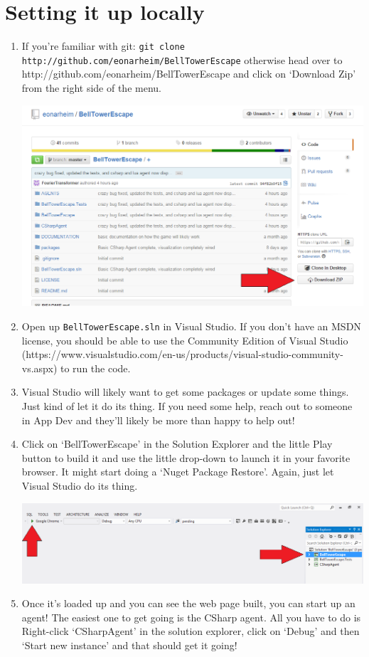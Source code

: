 \documentclass{article}
\begin{document}
\section*{Setting it up locally}
\begin{enumerate}
\item If you're familiar with git: \verb|git clone http://github.com/eonarheim/BellTowerEscape| otherwise head over to http://github.com/eonarheim/BellTowerEscape and click on `Download Zip' from the right side of the menu.

\includegraphics[width=6.5in]{1-DownloadZip.png}

\item Open up \verb|BellTowerEscape.sln| in Visual Studio. If you don't have an MSDN license, you should be able to use the Community Edition of Visual Studio (https://www.visualstudio.com/en-us/products/visual-studio-community-vs.aspx) to run the code.

\item Visual Studio will likely want to get some packages or update some things. Just kind of let it do its thing. If you need some help, reach out to someone in App Dev and they'll likely be more than happy to help out!

\item Click on `BellTowerEscape' in the Solution Explorer and the little Play button to build it and use the little drop-down to launch it in your favorite browser. It might start doing a `Nuget Package Restore'. Again, just let Visual Studio do its thing.

\includegraphics[width=6.5in]{4-BuildIt.png}
\newpage
\item Once it's loaded up and you can see the web page built, you can start up an agent! The easiest one to get going is the CSharp agent. All you have to do is Right-click `CSharpAgent' in the solution explorer, click on `Debug' and then `Start new instance' and that should get it going!


\end{enumerate}
\end{document}
